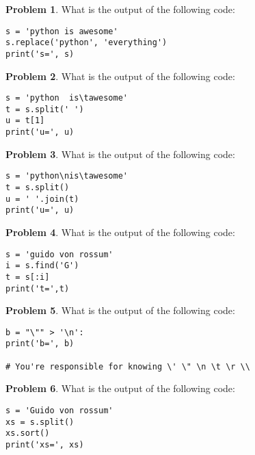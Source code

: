 \documentclass[10pt]{article}
\theoremstyle{definition}
\newtheorem{problem}{Problem}
\begin{document}
\newpage
\begin{problem}
    What is the output of the following code:
\end{problem}
\begin{lstlisting}
s = 'python is awesome'
s.replace('python', 'everything')
print('s=', s)
\end{lstlisting}
\vspace{1.5in}

\begin{problem}
    What is the output of the following code:
\end{problem}
\begin{lstlisting}
s = 'python  is\tawesome'
t = s.split(' ')
u = t[1]
print('u=', u)
\end{lstlisting}
\vspace{1.5in}

\begin{problem}
    What is the output of the following code:
\end{problem}
\begin{lstlisting}
s = 'python\nis\tawesome'
t = s.split()
u = ' '.join(t)
print('u=', u)
\end{lstlisting}
\vspace{1.5in}

\newpage
\begin{problem}
    What is the output of the following code:
\end{problem}
\begin{lstlisting}
s = 'guido von rossum'
i = s.find('G')
t = s[:i]
print('t=',t)
\end{lstlisting}
\vspace{1.5in}

\begin{problem}
    What is the output of the following code:
\end{problem}
\begin{lstlisting}
b = "\"" > '\n':
print('b=', b)

# You're responsible for knowing \' \" \n \t \r \\
\end{lstlisting}
\vspace{1.5in}


\begin{problem}
    What is the output of the following code:
\end{problem}
\begin{lstlisting}
s = 'Guido von rossum'
xs = s.split()
xs.sort()
print('xs=', xs)
\end{lstlisting}
\vspace{1.5in}
\end{document}
